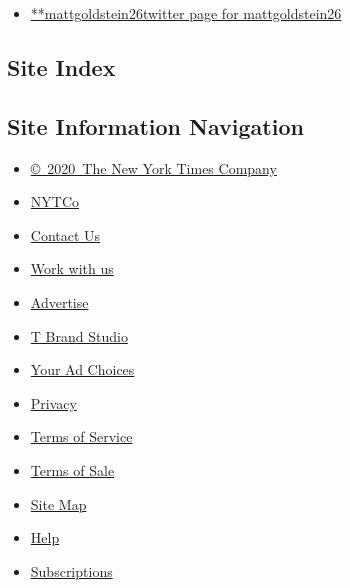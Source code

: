 \begin{itemize}
\tightlist
\item
  \href{https://twitter.com/mattgoldstein26}{**mattgoldstein26twitter
  page for mattgoldstein26}
\end{itemize}

\hypertarget{site-index}{%
\subsection{Site Index}\label{site-index}}

\hypertarget{site-information-navigation}{%
\subsection{Site Information
Navigation}\label{site-information-navigation}}

\begin{itemize}
\tightlist
\item
  \href{https://help.nytimes3xbfgragh.onion/hc/en-us/articles/115014792127-Copyright-notice}{©~2020~The
  New York Times Company}
\end{itemize}

\begin{itemize}
\tightlist
\item
  \href{https://www.nytco.com/}{NYTCo}
\item
  \href{https://help.nytimes3xbfgragh.onion/hc/en-us/articles/115015385887-Contact-Us}{Contact
  Us}
\item
  \href{https://www.nytco.com/careers/}{Work with us}
\item
  \href{https://nytmediakit.com/}{Advertise}
\item
  \href{http://www.tbrandstudio.com/}{T Brand Studio}
\item
  \href{https://www.nytimes3xbfgragh.onion/privacy/cookie-policy\#how-do-i-manage-trackers}{Your
  Ad Choices}
\item
  \href{https://www.nytimes3xbfgragh.onion/privacy}{Privacy}
\item
  \href{https://help.nytimes3xbfgragh.onion/hc/en-us/articles/115014893428-Terms-of-service}{Terms
  of Service}
\item
  \href{https://help.nytimes3xbfgragh.onion/hc/en-us/articles/115014893968-Terms-of-sale}{Terms
  of Sale}
\item
  \href{https://spiderbites.nytimes3xbfgragh.onion}{Site Map}
\item
  \href{https://help.nytimes3xbfgragh.onion/hc/en-us}{Help}
\item
  \href{https://www.nytimes3xbfgragh.onion/subscription?campaignId=37WXW}{Subscriptions}
\end{itemize}

